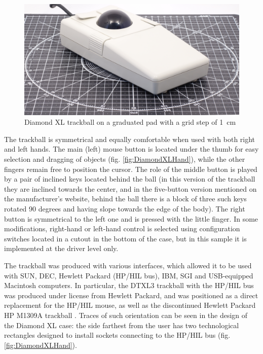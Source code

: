 \documentclass[11pt, a4paper]{article}
\begin{document}
\begin{figure}[h]
    \centering
    \includegraphics[scale=0.35]{1993_evergreen_diamond_xl_trackball/size.jpg}
    \caption{Diamond XL trackball on a graduated pad with a grid step of 1~cm}
    \label{fig:DiamondXLSize}
\end{figure}

The trackball is symmetrical and equally comfortable when used with both right and left hands. The main (left) mouse button is located under the thumb for easy selection and dragging of objects (fig. \ref{fig:DiamondXLHand}), while the other fingers remain free to position the cursor. The role of the middle button is played by a pair of inclined keys located behind the ball (in this version of the trackball they are inclined towards the center, and in the five-button version \cite{evergreen} mentioned on the manufacturer's website, behind the ball there is a block of three such keys rotated 90 degrees and having slope towards the edge of the body). The right button is symmetrical to the left one and is pressed with the little finger. In some modifications, right-hand or left-hand control is selected using configuration switches located in a cutout in the bottom of the case, but in this sample it is implemented at the driver level only.

The trackball was produced with various interfaces, which allowed it to be used with SUN, DEC, Hewlett Packard (HP/HIL bus), IBM, SGI and USB-equipped Macintosh computers. In particular, the DTXL3 trackball with the HP/HIL bus was produced under license from Hewlett Packard, and was positioned as a direct replacement for the HP/HIL mouse, as well as the discontinued Hewlett Packard HP M1309A trackball \cite{dtxl3, hphil}. 
Traces of such orientation can be seen in the design of the Diamond XL case: the side farthest from the user has two technological rectangles designed to install sockets connecting to the HP/HIL bus (fig. \ref{fig:DiamondXLHand}).
\end{document}
